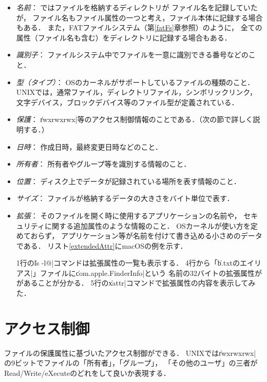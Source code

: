 \begin{itemize}
\item \emph{名前}：
  ではファイルを格納するディレクトリが
  ファイル名を記録していたが，
  ファイル名もファイル属性の一つと考え，ファイル本体に記録する場合もある．
  また，FATファイルシステム（第\ref{fatFs}章参照）のように，
  全ての属性（ファイル名も含む）をディレクトリに記録する場合もある．
\item \emph{識別子}：
  ファイルシステム中でファイルを一意に識別できる番号などのこと．
\item \emph{型（タイプ）}：
  OSのカーネルがサポートしているファイルの種類のこと．
  UNIXでは，通常ファイル，ディレクトリファイル，シンボリックリンク，
  文字デバイス，ブロックデバイス等のファイル型が定義されている．
\item \emph{保護}：
  \|rwxrwxrwx|等のアクセス制御情報のことである．（次の節で詳しく説明する．）
\item \emph{日時}：
  作成日時，最終変更日時などのこと．
\item \emph{所有者}：
  所有者やグループ等を識別する情報のこと．
\item \emph{位置}：
  ディスク上でデータが記録されている場所を表す情報のこと．
\item \emph{サイズ}：
  ファイルが格納するデータの大きさをバイト単位で表す．
\item \emph{拡張}：
  そのファイルを開く時に使用するアプリケーションの名前や，
  セキュリティに関する追加属性のような情報のこと．
  OSカーネルが使い方を定めておらず，
  アプリケーション等が名前を付けて書き込める小さめのデータである．
  リスト\ref{extendedAttr}にmacOSの例を示す．

  

  1行の\|ls -l@|コマンドは拡張属性の一覧も表示する．
  4行から「\|b.txtのエイリアス|」ファイルに\|com.apple.FinderInfo|という
  名前の32バイトの拡張属性ががあることが分かる．
  5行の\|xattr|コマンドで拡張属性の内容を表示してみた．
\end{itemize}

\section{アクセス制御}
ファイルの保護属性に基づいたアクセス制御ができる．
UNIXでは\|rwxrwxrwx|の9ビットでファイルの「所有者」，「グループ」，
「その他のユーザ」の三者がRead/Write/eXecuteのどれをして良いか表現する．

